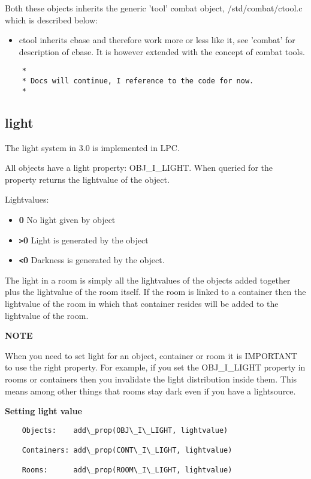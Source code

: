 Both these objects inherits the generic 'tool' combat object,
 /std/combat/ctool.c which is described below:

\begin{itemize}
    \item  ctool inherits cbase and therefore work more or less like it,
      see 'combat' for description of cbase. It is however extended
      with the concept of combat tools. 
\end{itemize}

\begin{verbatim}
    *
    * Docs will continue, I reference to the code for now.
    *
\end{verbatim}


\subsection{light}

The light system in 3.0 is implemented in LPC.

All objects have a light property: OBJ\_I\_LIGHT. When queried for
the property returns the lightvalue of the object.
    
Lightvalues:
\begin{itemize}
\item{\bf 0} No light given by object
\item{\bf \verb+>+0} Light is generated by the object
\item{\bf \verb+<+0} Darkness is generated by the object.
\end{itemize}

The light in a room is simply all the lightvalues of the objects
added together plus the lightvalue of the room itself. If the room
is linked to a container then the lightvalue of the room in which
that container resides will be added to the lightvalue of the room.

{\bf NOTE}
    
  When you need to set light for an object, container or room it is
  IMPORTANT to use the right property. For example, if you set the
  OBJ\_I\_LIGHT property in rooms or containers then you invalidate
  the light distribution inside them. This means among other things
  that rooms stay dark even if you have a lightsource.

{\bf Setting light value}


\begin{verbatim}
    Objects:    add\_prop(OBJ\_I\_LIGHT, lightvalue)

    Containers: add\_prop(CONT\_I\_LIGHT, lightvalue)

    Rooms:      add\_prop(ROOM\_I\_LIGHT, lightvalue)
\end{verbatim}  


